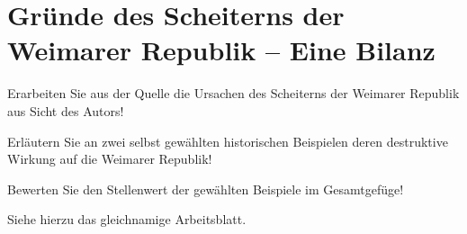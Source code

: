 \section{Gründe des Scheiterns der Weimarer Republik -- Eine Bilanz}

\begin{aufgabe}
Erarbeiten Sie aus der Quelle die Ursachen des Scheiterns der Weimarer
Republik aus Sicht des Autors!

Erläutern Sie an zwei selbst gewählten historischen Beispielen deren
destruktive Wirkung auf die Weimarer Republik!

Bewerten Sie den Stellenwert der gewählten Beispiele im Gesamtgefüge!
\end{aufgabe}

Siehe hierzu das gleichnamige Arbeitsblatt.

\endinput
